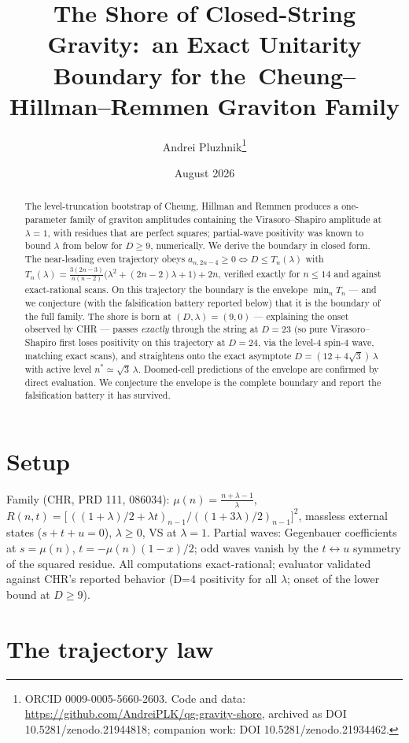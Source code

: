 \documentclass[11pt]{article}
\title{The Shore of Closed-String Gravity:\ an Exact Unitarity Boundary for the\ Cheung--Hillman--Remmen Graviton Family}
\author{Andrei Pluzhnik\thanks{ORCID 0009-0005-5660-2603. Code and data:
\url{https://github.com/AndreiPLK/qg-gravity-shore}, archived as DOI
10.5281/zenodo.21944818; companion work: DOI 10.5281/zenodo.21934462.}}
\date{August 2026}
\begin{document}
\maketitle

\begin{abstract}
The level-truncation bootstrap of Cheung, Hillman and Remmen produces a
one-parameter family of graviton amplitudes containing the Virasoro--Shapiro
amplitude at $\lambda=1$, with residues that are perfect squares; partial-wave
positivity was known to bound $\lambda$ from below for $D\ge 9$, numerically.
We derive the boundary in closed form. The near-leading even trajectory obeys
$a_{n,2n-4}\ge 0 \iff D\le T_n(\lambda)$ with
$T_n(\lambda)=\tfrac{3(2n-3)}{n(n-2)}\bigl(\lambda^2+(2n-2)\lambda+1\bigr)+2n$,
verified exactly for $n\le 14$ and against exact-rational scans. On this trajectory the boundary is the envelope $\min_nT_n$ --- and we
conjecture (with the falsification battery reported below) that it is the
boundary of the full family. The shore is born at $(D,\lambda)=(9,0)$ ---
explaining the onset observed by CHR --- passes \emph{exactly} through the
string at $D=23$ (so pure Virasoro--Shapiro first loses positivity on this
trajectory at $D=24$, via the level-4 spin-4 wave, matching exact scans), and
straightens onto the exact asymptote $D=(12+4\sqrt3)\,\lambda$ with active
level $n^*\simeq\sqrt3\,\lambda$. Doomed-cell predictions of the envelope are
confirmed by direct evaluation. We conjecture the envelope is the complete
boundary and report the falsification battery it has survived.
\end{abstract}

\section{Setup}
Family (CHR, PRD 111, 086034): $\mu(n)=\frac{n+\lambda-1}{\lambda}$,
$R(n,t)=\bigl[\,((1{+}\lambda)/2+\lambda t)_{n-1}/((1{+}3\lambda)/2)_{n-1}\bigr]^2$,
massless external states ($s+t+u=0$), $\lambda\ge0$, VS at $\lambda=1$.
Partial waves: Gegenbauer coefficients at $s=\mu(n)$, $t=-\mu(n)(1-x)/2$; odd
waves vanish by the $t\leftrightarrow u$ symmetry of the squared residue.
All computations exact-rational; evaluator validated against CHR's reported
behavior (D=4 positivity for all $\lambda$; onset of the lower bound at
$D\ge9$).

\section{The trajectory law}
\end{document}
